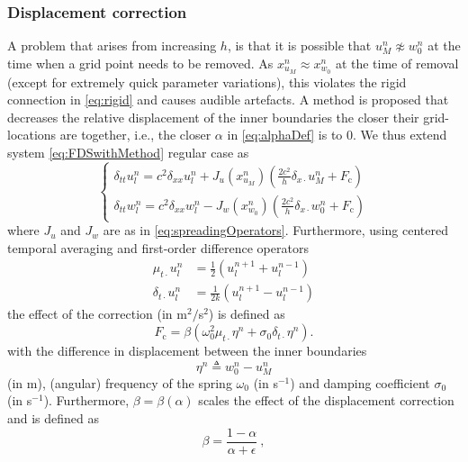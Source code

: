 \subsubsection{Displacement correction}\label{sec:dispCorr}
A problem that arises from increasing $h$, is that it is possible that $u_M^n \not\approx w_0^n$ at the time when a grid point needs to be removed. As $x_{u_M}^n \approx x_{w_0}^n$ at the time of removal (except for extremely quick parameter variations), this violates the rigid connection in \eqref{eq:rigid} and causes audible artefacts. A method is proposed that decreases the relative displacement of the inner boundaries the closer their grid-locations are together, i.e., the closer $\alpha$ in \eqref{eq:alphaDef} is to 0. We thus extend system \eqref{eq:FDSwithMethod} regular case as
\begin{equation}\label{eq:sysDispCorr}
\begin{cases}
    \delta_{tt}u_l^n = c^2\delta_{xx}u_l^n+ J_u(x_{u_M}^n)\left(\frac{2c^2}{h}\delta_{x\cdot}u_M^n + F_\text{c}\right)\\
    \delta_{tt}w_l^n = c^2\delta_{xx}w_l^n - J_w(x_{w_0}^n)\left(\frac{2c^2}{h}\delta_{x\cdot}w_0^n+F_\text{c}\right)
\end{cases}
\end{equation}
where $J_u$ and $J_w$ are as in \eqref{eq:spreadingOperators}. Furthermore, using centered temporal averaging and first-order difference operators
\begin{align}\label{eq:centeredAverage}
    \mu_{t\cdot}u_l^n &= \frac{1}{2} \left(u_l^{n+1} + u_l^{n-1}\right)\\
    \delta_{t\cdot}u_l^n &= \frac{1}{2k} \left(u_l^{n+1} - u_l^{n-1}\right)
\end{align}
the effect of the correction (in m$^2/$s$^2$) is defined as
\begin{equation}
    F_\text{c} = \beta \left(\omega_0^2\mu_{t\cdot}\eta^n +\sigma_0\delta_{t\cdot}\eta^n \right).
\end{equation}
with the difference in displacement between the inner boundaries
\begin{equation}
    \eta^n \triangleq w_0^n - u_M^n 
\end{equation}
(in m), (angular) frequency of the spring $\omega_0$ (in s$^{-1}$) and damping coefficient $\sigma_0$ (in s$^{-1}$). Furthermore, $\beta = \beta(\alpha)$ scales the effect of the displacement correction and is defined as
\begin{equation}\label{eq:betaDef}
    \beta = \frac{1-\alpha}{\alpha + \epsilon}\ ,
\end{equation}
